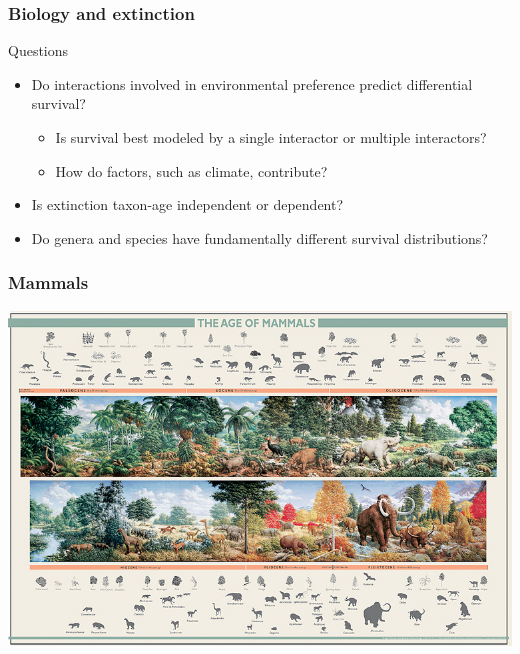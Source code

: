 \documentclass{beamer}
\begin{document}
\begin{frame}
  \frametitle{Biology and extinction}

  \begin{block}{Questions}
    \begin{itemize}
      \item Do interactions involved in environmental preference predict differential survival?
        \begin{itemize}
          \item Is survival best modeled by a single interactor or multiple interactors? 
          \item How do factors, such as climate, contribute? 
        \end{itemize}
      \item Is extinction taxon-age independent or dependent?
      \item Do genera and species have fundamentally different survival distributions?
    \end{itemize}
  \end{block}
\end{frame}

%
%
%

\begin{frame}
  \frametitle{Mammals}
  \includegraphics[height = 0.9\textheight, width = \textwidth, keepaspectratio = true]{figure/aom}

  \tiny{}
\end{frame}
\end{document}

